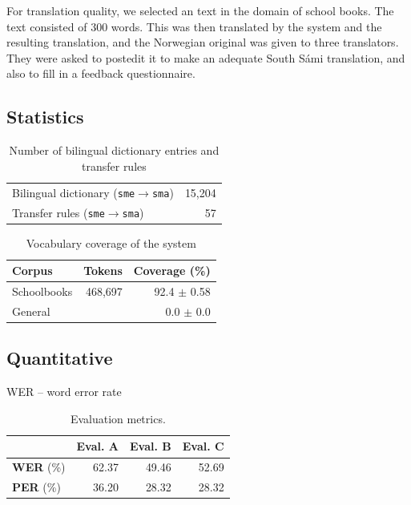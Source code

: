 \documentclass[a4paper,11pt,twocolumn]{article}
\begin{document}
For translation quality, we selected an text in the domain of school books. The 
text consisted of 300 words. This was then translated by the system and the resulting
translation, and the Norwegian original was given to three translators. They were
 asked to postedit it to make an adequate South Sámi translation, and also to fill
in a feedback questionnaire.

\subsection{Statistics}
\begin{table}
  \begin{center}
    \begin{tabular}{|l|r|}
      \hline
      Bilingual dictionary ({\tt sme}$\rightarrow${\tt sma}) & 15,204 \\ %
      Transfer rules ({\tt sme}$\rightarrow${\tt sma}) & 57 \\
      \hline
    \end{tabular}
    \label{table:transfer}
    \caption{Number of bilingual dictionary entries and transfer rules}
  \end{center}
\end{table}

\begin{table}
  \begin{center}
    \begin{tabular}{|l|r|r|}
      \hline
      \textbf{Corpus} & \textbf{Tokens} & \textbf{Coverage (\%)}  \\
      \hline
      Schoolbooks     & 468,697 & 92.4 $\pm$ 0.58 \\
      General         & & 0.0 $\pm$ 0.0 \\
      \hline
    \end{tabular}
    \label{table:coverage}
    \caption{Vocabulary coverage of the system}
  \end{center}
\end{table}

\subsection{Quantitative}



WER -- word error rate
\begin{table}
  \begin{center}
    \begin{tabular}{|l|r|r|r|}
      \hline
      & \textbf{Eval. A} & \textbf{Eval. B} & \textbf{Eval. C}  \\
      \hline
\textbf{WER} (\%) & 62.37  &  49.46  &  52.69 \\
\textbf{PER} (\%) &  36.20   &  28.32  &  28.32 \\
      \hline
    \end{tabular}
    \label{table:coverage}
    \caption{Evaluation metrics.}
  \end{center}
\end{table}
\end{document}
